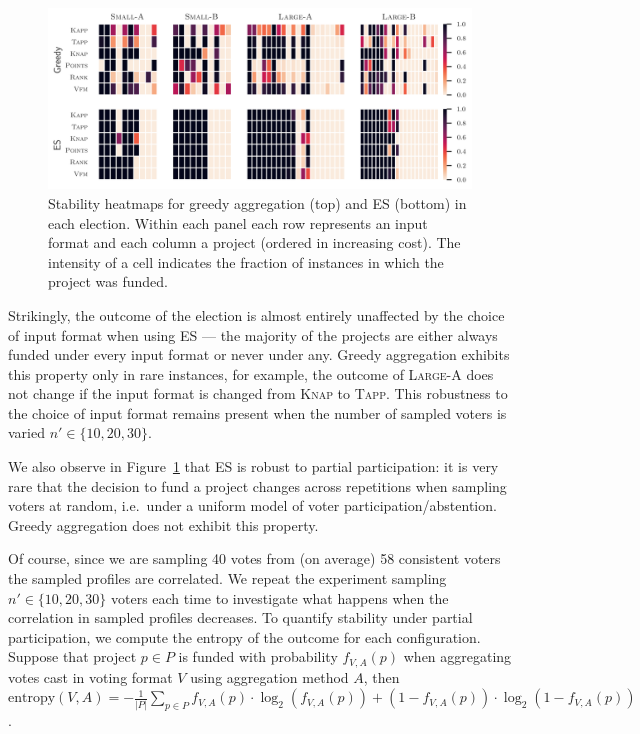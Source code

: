 \documentclass[runningheads]{llncs}
\newcommand{\knap}{\textsc{Knap}}
\newcommand{\tapp}{\textsc{Tapp}}
\newcommand{\mes}{ES}
\begin{document}
\begin{figure}[h]
\begin{center}
\includegraphics[width=14cm]{experiment/heatmaps.png}
\caption{Stability heatmaps for  greedy aggregation (top) and \mes{} (bottom) in each election. 
Within each panel each row represents an   input format and each column a project (ordered in increasing cost).
 The intensity of a cell indicates the fraction of instances in which the project was funded.
}\label{fig:heatmap}
\end{center}
\end{figure}

Strikingly, the outcome of the election is almost entirely unaffected by the choice of input format when using \mes{} --- the majority of the projects are either always funded under every input format or never under any. Greedy aggregation exhibits this property only in rare instances, for example, the outcome of \textsc{Large-A} does not change if the input format is changed from \knap{} to \tapp.  This robustness to the choice of input format remains present when the number of sampled voters is varied $n'\in\{10,20,30\}.$

We also observe in   Figure~\ref{fig:heatmap} that \mes{} is robust to partial participation: it is very rare that the decision to fund a project changes across repetitions when sampling voters at random, i.e.\ under a uniform model of voter participation/abstention. Greedy aggregation does not exhibit this property. 

Of course, since we are sampling 40 votes from (on average) 58 consistent voters the sampled profiles are correlated. We repeat the experiment sampling $n'\in\{10,20,30\}$ voters each time to investigate what happens when the correlation in sampled profiles decreases.
%
To quantify stability under partial participation, we compute the entropy of the outcome for each configuration. Suppose that project $p\in P$ is funded with probability $f_{V,A}(p)$ when aggregating votes cast in voting format $V$ using aggregation method $A$, then $\text{entropy}(V,A) = -\frac{1}{|P|}\sum_{p\in P} f_{V,A}(p) \cdot \log_2(f_{V,A}(p)) + (1 - f_{V,A}(p)) \cdot \log_2(1 - f_{V,A}(p))$.
\end{document}
